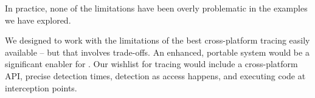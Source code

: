 \noindent In practice, none of the limitations have been overly problematic in the examples we have explored.


We designed \Rattle to work with the limitations of the best cross-platform tracing easily available -- but that involves trade-offs. An enhanced, portable system would be a significant enabler for \Rattle.
Our wishlist for tracing would include a cross-platform API, precise detection times, detection as access happens, and executing code at interception points.

